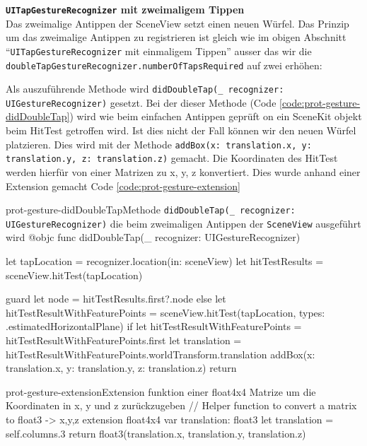 \begin{description}
    \textbf{\texttt{UITapGestureRecognizer} mit zweimaligem Tippen}\\
    Das zweimalige Antippen der SceneView setzt einen neuen Würfel. Das Prinzip um das zweimalige Antippen zu registrieren ist gleich wie im obigen Abschnitt "`\texttt{UITapGestureRecognizer} mit einmaligem Tippen"' ausser das wir die \texttt{doubleTapGestureRecognizer.numberOfTapsRequired} auf zwei erhöhen:

    Als auszuführende Methode wird \texttt{didDoubleTap(\_ recognizer: UIGestureRecognizer)} gesetzt. Bei der dieser Methode (Code \ref{code:prot-gesture-didDoubleTap}) wird wie beim einfachen Antippen geprüft on ein SceneKit objekt beim HitTest getroffen wird. Ist dies nicht der Fall können wir den neuen Würfel platzieren. Dies wird mit der Methode \texttt{addBox(x: translation.x, y: translation.y, z: translation.z)} gemacht. Die Koordinaten des HitTest werden hierfür von einer Matrizen zu x, y, z konvertiert. Dies wurde anhand einer Extension gemacht Code \ref{code:prot-gesture-extension}

    \begin{code}{prot-gesture-didDoubleTap}{Methode \texttt{didDoubleTap(\_ recognizer: UIGestureRecognizer)} die beim zweimaligen Antippen der \texttt{SceneView} ausgeführt wird}
    @objc
    func didDoubleTap(_ recognizer: UIGestureRecognizer) {
        let tapLocation = recognizer.location(in: sceneView)
        let hitTestResults = sceneView.hitTest(tapLocation)
        
        guard let node = hitTestResults.first?.node else {
            let hitTestResultWithFeaturePoints = sceneView.hitTest(tapLocation, types: .estimatedHorizontalPlane)
            if let hitTestResultWithFeaturePoints = hitTestResultWithFeaturePoints.first {
                let translation = hitTestResultWithFeaturePoints.worldTransform.translation
                addBox(x: translation.x, y: translation.y, z: translation.z)
            }
            return
        }
    }
    \end{code}

    \begin{code}{prot-gesture-extension}{Extension funktion einer float4x4 Matrize um die Koordinaten in x, y und z zurückzugeben}
    // Helper function to convert a matrix to float3 -> x,y,z
    extension float4x4 {
        var translation: float3 {
            let translation = self.columns.3
            return float3(translation.x, translation.y, translation.z)
        }
    }
    \end{code}


\end{description}
